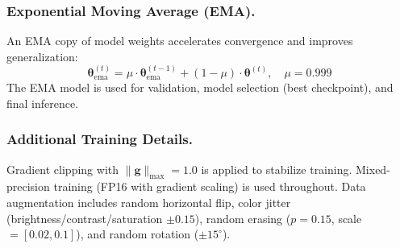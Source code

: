 \documentclass[11pt,a4paper]{article}
\begin{document}
\subsubsection{Exponential Moving Average (EMA).}
An EMA copy of model weights accelerates convergence and improves generalization:
\begin{equation}
\boldsymbol{\theta}_{\text{ema}}^{(t)} = \mu \cdot \boldsymbol{\theta}_{\text{ema}}^{(t-1)} + (1 - \mu) \cdot \boldsymbol{\theta}^{(t)}, \quad \mu = 0.999
\label{eq:ema}
\end{equation}
The EMA model is used for validation, model selection (best checkpoint), and final inference.

\subsubsection{Additional Training Details.}
Gradient clipping with $\|\mathbf{g}\|_{\max} = 1.0$ is applied to stabilize training. Mixed-precision training (FP16 with gradient scaling) is used throughout. Data augmentation includes random horizontal flip, color jitter (brightness/contrast/saturation $\pm 0.15$), random erasing ($p = 0.15$, scale $= [0.02, 0.1]$), and random rotation ($\pm 15^\circ$).
\end{document}
